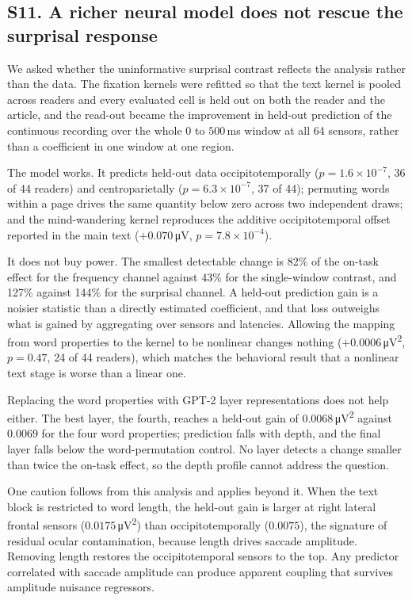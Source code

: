 \documentclass[11pt]{article}
\begin{document}
\subsection*{S11. A richer neural model does not rescue the surprisal response}

We asked whether the uninformative surprisal contrast reflects the analysis rather than the
data. The fixation kernels were refitted so that the text kernel is pooled across readers and
every evaluated cell is held out on both the reader and the article, and the read-out became the
improvement in held-out prediction of the continuous recording over the whole $0$ to
$500$\,\si{\milli\second} window at all 64 sensors, rather than a coefficient in one window at
one region.

The model works. It predicts held-out data occipitotemporally ($p=1.6\times10^{-7}$, 36 of 44
readers) and centroparietally ($p=6.3\times10^{-7}$, 37 of 44); permuting words within a page
drives the same quantity below zero across two independent draws; and the mind-wandering kernel
reproduces the additive occipitotemporal offset reported in the main text
($+0.070$\,\si{\micro\volt}, $p=7.8\times10^{-4}$).

It does not buy power. The smallest detectable change is 82\% of the on-task effect for the
frequency channel against 43\% for the single-window contrast, and 127\% against 144\% for the
surprisal channel. A held-out prediction gain is a noisier statistic than a directly estimated
coefficient, and that loss outweighs what is gained by aggregating over sensors and latencies.
Allowing the mapping from word properties to the kernel to be nonlinear changes nothing
($+0.0006$\,\si{\micro\volt\squared}, $p=0.47$, 24 of 44 readers), which matches the behavioral
result that a nonlinear text stage is worse than a linear one.

Replacing the word properties with GPT-2 layer representations does not help either. The best
layer, the fourth, reaches a held-out gain of $0.0068$\,\si{\micro\volt\squared} against
$0.0069$ for the four word properties; prediction falls with depth, and the final layer falls
below the word-permutation control. No layer detects a change smaller than twice the on-task
effect, so the depth profile cannot address the question.

One caution follows from this analysis and applies beyond it. When the text block is restricted
to word length, the held-out gain is larger at right lateral frontal sensors
($0.0175$\,\si{\micro\volt\squared}) than occipitotemporally ($0.0075$), the signature of
residual ocular contamination, because length drives saccade amplitude. Removing length restores
the occipitotemporal sensors to the top. Any predictor correlated with saccade amplitude can
produce apparent coupling that survives amplitude nuisance regressors.
\end{document}
